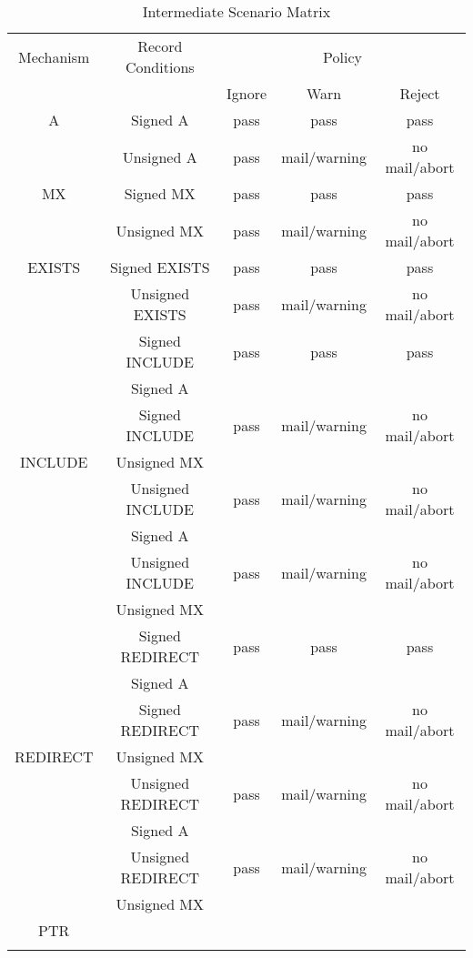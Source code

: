 \documentclass[12pt]{article}
\begin{document}
\begin{table}[ht]
\begin{center}
\begin{tabular}{|c|c|c|c|c|}
\hline
Mechanism & Record Conditions	& \multicolumn{3}{c|}{Policy}	\\
\cline{3-5}
	  & 			& Ignore & Warn & Reject \\
\hline

A & Signed A		& pass	& pass		& pass \\
\cline{2-5}
  & Unsigned A		& pass	& mail/warning	& no mail/abort \\
\hline

MX & Signed MX		& pass	& pass		& pass \\
\cline{2-5}
   & Unsigned MX	& pass	& mail/warning	& no mail/abort \\
\hline

EXISTS & Signed EXISTS		& pass	& pass		& pass \\
\cline{2-5}
       & Unsigned EXISTS	& pass	& mail/warning	& no mail/abort \\
\hline

	& Signed INCLUDE	& pass	& pass		& pass		\\
	& Signed A		&	&		&		\\
\cline{2-5}
	& Signed INCLUDE	& pass	& mail/warning	& no mail/abort \\
INCLUDE	& Unsigned MX		&	&		&		\\
\cline{2-5}
	& Unsigned INCLUDE & pass & mail/warning	& no mail/abort \\
	& Signed A	   &	  &			&		\\
\cline{2-5}
	& Unsigned INCLUDE & pass & mail/warning	& no mail/abort \\
	& Unsigned MX	   &	  &			&		\\
\hline

	 & Signed REDIRECT & pass & pass		& pass		\\
	 & Signed A	   &	  & 			&		\\
\cline{2-5}
	 & Signed REDIRECT & pass & mail/warning	& no mail/abort \\
REDIRECT & Unsigned MX	   &	  &			&		\\
\cline{2-5}
	 & Unsigned REDIRECT & pass & mail/warning & no mail/abort \\
	 & Signed A	     &	    & 		  	&		  \\
\cline{2-5}
	 & Unsigned REDIRECT & pass & mail/warning & no mail/abort \\
	 & Unsigned MX	     &	    &		  	&		  \\
\hline

PTR	&	&	&	&	\\
\cline{2-5}
	&	&	&	&	\\
\hline
\end{tabular}
\caption{Intermediate Scenario Matrix}
\label{intermediatematrix}
\end{center}
\end{table}
\end{document}
